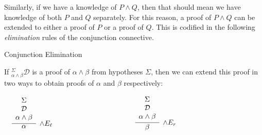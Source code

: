 \documentclass{book}
\begin{document}
    Similarly, if we have a knowledge of $P \land Q$, then that should mean we have knowledge of both $P$ and $Q$ separately. For this reason, a proof of $P \land Q$ can be extended to either a proof of $P$ or a proof of $Q$. This is codified in the following \emph{elimination} rules of the conjunction connective. 

    \begin{definition}{Conjunction Elimination}

        If $^{\Sigma}_{\alpha \land \beta}\mathcal{D}$ is a proof of $\alpha \land \beta$ from hypotheses $\Sigma$, then we can extend this proof in two ways to obtain proofs of $\alpha$ and $\beta$ respectively: 

        \begin{center}
            $\begin{array} { c c c }
            
            \begin{array}{ c  c  c }			
                 \infer[\land E_{\ell}]{\alpha}
                    {\begin{array}{c}
                        \Sigma \\
                        \mathcal{D} \\
                        \alpha \land \beta
                    \end{array}}
            \end{array}
    
            & \hspace{3cm} &
    
            \begin{array}{ c  c  c }			
                \infer[\land E_{r}]{\beta}
                {\begin{array}{c}
                    \Sigma \\
                    \mathcal{D} \\
                    \alpha \land \beta
                \end{array}}	
            \end{array}\\		
    
            \end{array}$
        \end{center}	
    \end{definition}
\end{document}
